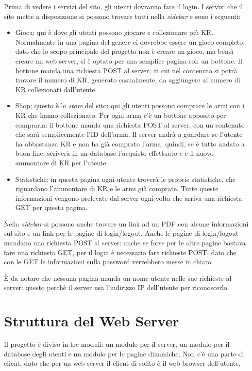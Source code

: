 \documentclass[a4paper,12pt]{report}
\begin{document}
Prima di vedere i servizi del sito, gli utenti dovranno fare il login. I servizi che il sito mette a disposizione si possono trovare tutti nella \textit{sidebar} e sono i seguenti:
\begin{itemize}
\item Gioca: qui è dove gli utenti possono giocare e collezionare più KR. Normalmente in una pagina del genere ci dovrebbe essere un gioco completo; dato che lo scopo principale del progetto non è creare un gioco, ma bensì creare un web server, si è optato per una semplice pagina con un bottone. Il bottone manda una richiesta POST al server, in cui nel contenuto si potrà trovare il numero di KR, generato casualmente, da aggiungere al numero di KR collezionati dall'utente.
\item Shop: questo è lo \textit{store} del sito: qui gli utenti possono comprare le armi con i KR che hanno collezionato. Per ogni arma c'è un bottone apposito per comprarla: il bottone manda una richiesta POST al server, con un contenuto che sarà semplicemente l'ID dell'arma. Il server andrà a guardare se l'utente ha abbastanza KR e non ha già comprato l'arma; quindi, se è tutto andato a buon fine, scriverà in un database l'acquisto effettuato e e il nuovo ammontare di KR per l'utente.
\item Statistiche: in questa pagina ogni utente troverà le proprie statistiche, che riguardano l'ammontare di KR e le armi già comprate. Tutte queste informazioni vengono prelevate dal server ogni volta che arriva una richiesta GET per questa pagina.
\end{itemize}

Nella \textit{sidebar} si possono anche trovare un link ad un PDF con alcune informazioni sul sito e un link per le pagine di login/logout. Anche le pagine di login/logout mandano una richiesta POST al server: anche se forse per le altre pagine bastava fare una richiesta GET, per il login è necessario fare richieste POST, dato che con le GET le informazioni sulla password verrebbero messe in chiaro.

È da notare che nessuna pagina manda un nome utente nelle sue richieste al server: questo perchè il server usa l'indirizzo IP dell'utente per riconoscerlo.

\chapter{Struttura del Web Server}

Il progetto è diviso in tre moduli: un modulo per il server, un modulo per il database degli utenti e un modulo per le pagine dinamiche. Non c'è una parte di client, dato che per un web server il client di solito è il web browser dell'utente.
\end{document}
